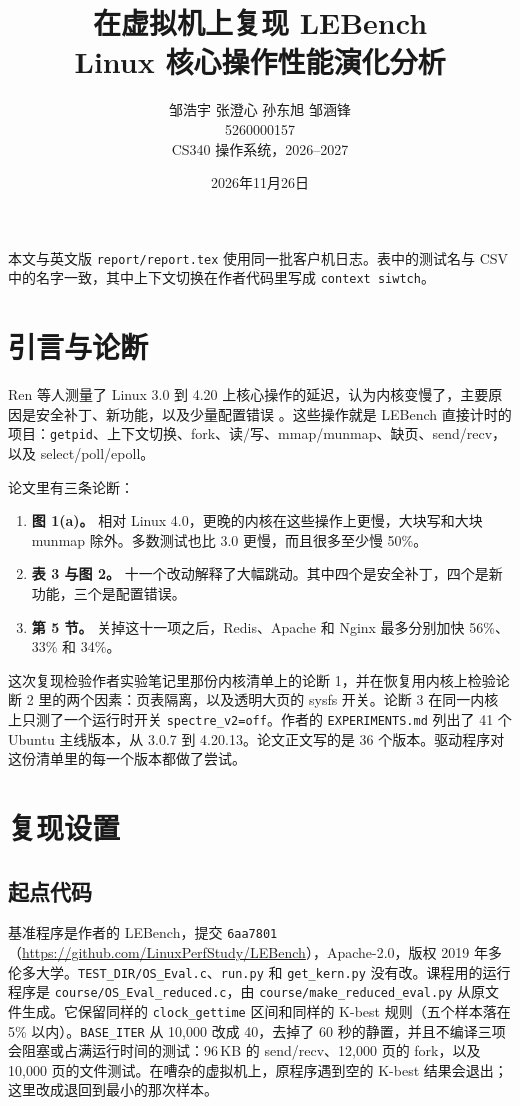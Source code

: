 \documentclass[11pt,fontset=none]{ctexart}
\title{在虚拟机上复现 LEBench\\
\large Linux 核心操作性能演化分析}
\author{邹浩宇 \quad 张澄心 \quad 孙东旭 \quad 邹涵锋\\
5260000157 \quad 1240016541 \quad 5260000073 \quad 1240020460\\
CS340 操作系统，2026--2027}
\date{2026年11月26日}
\begin{document}
\maketitle

本文与英文版 \texttt{report/report.tex} 使用同一批客户机日志。表中的测试名与 CSV 中的名字一致，其中上下文切换在作者代码里写成 \texttt{context siwtch}。

\section{引言与论断}

Ren 等人测量了 Linux 3.0 到 4.20 上核心操作的延迟，认为内核变慢了，主要原因是安全补丁、新功能，以及少量配置错误 \cite{ren2019lebench}。这些操作就是 LEBench 直接计时的项目：\texttt{getpid}、上下文切换、fork、读/写、mmap/munmap、缺页、send/recv，以及 select/poll/epoll。

论文里有三条论断：

\begin{enumerate}
\item \textbf{图 1(a)。} 相对 Linux 4.0，更晚的内核在这些操作上更慢，大块写和大块 munmap 除外。多数测试也比 3.0 更慢，而且很多至少慢 50\%。
\item \textbf{表 3 与图 2。} 十一个改动解释了大幅跳动。其中四个是安全补丁，四个是新功能，三个是配置错误。
\item \textbf{第 5 节。} 关掉这十一项之后，Redis、Apache 和 Nginx 最多分别加快 56\%、33\% 和 34\%。
\end{enumerate}

这次复现检验作者实验笔记里那份内核清单上的论断 1，并在恢复用内核上检验论断 2 里的两个因素：页表隔离，以及透明大页的 sysfs 开关。论断 3 在同一内核上只测了一个运行时开关 \texttt{spectre\_v2=off}。作者的 \texttt{EXPERIMENTS.md} 列出了 41 个 Ubuntu 主线版本，从 3.0.7 到 4.20.13。论文正文写的是 36 个版本。驱动程序对这份清单里的每一个版本都做了尝试。

\section{复现设置}

\subsection{起点代码}

基准程序是作者的 LEBench，提交 \texttt{6aa7801}（\url{https://github.com/LinuxPerfStudy/LEBench}），Apache-2.0，版权 2019 年多伦多大学。\texttt{TEST\_DIR/OS\_Eval.c}、\texttt{run.py} 和 \texttt{get\_kern.py} 没有改。课程用的运行程序是 \texttt{course/OS\_Eval\_reduced.c}，由 \texttt{course/make\_reduced\_eval.py} 从原文件生成。它保留同样的 \texttt{clock\_gettime} 区间和同样的 K-best 规则（五个样本落在 5\% 以内）。\texttt{BASE\_ITER} 从 10{,}000 改成 40，去掉了 60 秒的静置，并且不编译三项会阻塞或占满运行时间的测试：96\,KB 的 send/recv、12{,}000 页的 fork，以及 10{,}000 页的文件测试。在嘈杂的虚拟机上，原程序遇到空的 K-best 结果会退出；这里改成退回到最小的那次样本。
\end{document}
